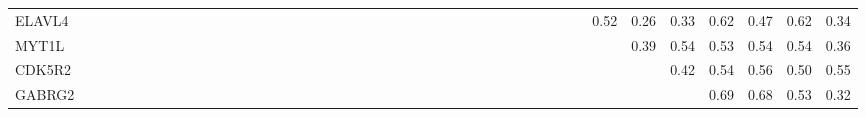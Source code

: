 \begin{longtable}{lrrrrrrrrrrrrrrrrrrrrrrrrrrrrrrrrrrrrrrrrrrr}
ELAVL4   &            &             &             &             &              &            &               &             &            &            &               &            &            &             &              &                &              &            &             &              &             &              &            &            &              &             &              &              &              &            &               &              &            &             &              &              &        0.52 &         0.26 &         0.33 &      0.62 &        0.47 &         0.62 &          0.34 \\
MYT1L    &            &             &             &             &              &            &               &             &            &            &               &            &            &             &              &                &              &            &             &              &             &              &            &            &              &             &              &              &              &            &               &              &            &             &              &              &             &         0.39 &         0.54 &      0.53 &        0.54 &         0.54 &          0.36 \\
CDK5R2   &            &             &             &             &              &            &               &             &            &            &               &            &            &             &              &                &              &            &             &              &             &              &            &            &              &             &              &              &              &            &               &              &            &             &              &              &             &              &         0.42 &      0.54 &        0.56 &         0.50 &          0.55 \\
GABRG2   &            &             &             &             &              &            &               &             &            &            &               &            &            &             &              &                &              &            &             &              &             &              &            &            &              &             &              &              &              &            &               &              &            &             &              &              &             &              &              &      0.69 &        0.68 &         0.53 &          0.32 \\

\end{longtable}
